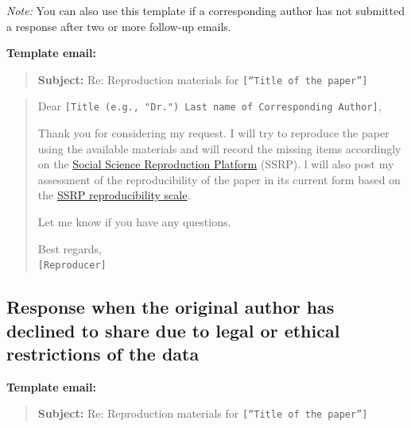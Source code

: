\documentclass[]{book}
\begin{document}
\emph{Note:} You can also use this template if a corresponding author has not submitted a response after two or more follow-up emails.

\textbf{Template email:}

\begin{quote}
\textbf{Subject:} Re: Reproduction materials for \texttt{{[}“Title\ of\ the\ paper”{]}}
\end{quote}

\begin{quote}
Dear \texttt{{[}Title\ (e.g.,\ "Dr.")\ Last\ name\ of\ Corresponding\ Author{]}},

Thank you for considering my request. I will try to reproduce the paper using the available materials and will record the missing items accordingly on the \href{https://www.socialsciencereproduction.org/}{Social Science Reproduction Platform} (SSRP). l will also post my assessment of the reproducibility of the paper in its current form based on the \href{https://bitss.github.io/ACRE/assessment.html\#levels-of-computational-reproducibility-for-a-specific-output}{SSRP reproducibility scale}.

Let me know if you have any questions.

Best regards,\\
\texttt{{[}Reproducer{]}}
\end{quote}

\hypertarget{response-when-the-original-author-has-declined-to-share-due-to-legal-or-ethical-restrictions-of-the-data}{%
\subsection{Response when the original author has declined to share due to legal or ethical restrictions of the data}\label{response-when-the-original-author-has-declined-to-share-due-to-legal-or-ethical-restrictions-of-the-data}}

\textbf{Template email:}

\begin{quote}
\textbf{Subject:} Re: Reproduction materials for \texttt{{[}“Title\ of\ the\ paper”{]}}
\end{quote}
\end{document}

